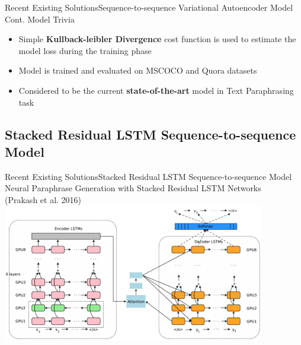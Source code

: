 \documentclass[10pt]{beamer}
\begin{document}
\begin{frame}{Recent Existing Solutions}{Sequence-to-sequence Variational Autoencoder Model Cont.}
Model Trivia
\begin{itemize}
	\item <1-> Simple \textbf{Kullback-leibler Divergence} cost function is used to estimate the model loss during the training phase
    \item <1-> Model is trained and evaluated on MSCOCO and Quora datasets
	\item <1-> Considered to be the current \textbf{state-of-the-art} model in Text Paraphrasing task
\end{itemize}
\end{frame}

\subsection{Stacked Residual LSTM Sequence-to-sequence Model}
\begin{frame}{Recent Existing Solutions}{Stacked Residual LSTM Sequence-to-sequence Model}
\centering
Neural Paraphrase Generation with Stacked Residual LSTM Networks \\
(Prakash et al. 2016)
\centering
\includegraphics[width=11.5cm, height=6cm]{nmt.png}
\end{frame}
\end{document}
